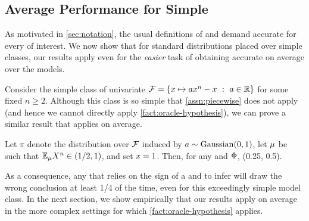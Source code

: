 %
%
%
%
%
%
%
%
%
%
%
%
%
%
%
%
%
%


\subsection{Average \localName{} Performance for Simple \modelNames{}}\label{sec:average-behaviour}

As motivated in \cref{sec:notation}, the usual definitions of \specname{} and \sensname{} demand accurate \hyptestnames{} for every \modelname{} of interest. We now show that for standard distributions placed over simple \modelname{} classes, our results apply even for the \emph{easier} task of obtaining accurate \hyptestnames{} on average over the models.

Consider the simple class of univariate \modelnames{} $\mathcal{F} = \{x\mapsto a x^n - x \ : \  a\in\mathbb{R}\}$ for some fixed $n \geq 2$. Although this \modelname{} class is so simple that \cref{assn:piecewise} does not apply (and hence we cannot directly apply \cref{fact:oracle-hypothesis}), we can prove a similar result that applies on average.

\begin{proposition}\label{fact:random-quadratic}
Let $\pi$ denote the distribution over $\mathcal{F}$ induced by $a \sim \mathrm{Gaussian}(0,1)$, let $\mu$ be such that $\mathbb{E}_\mu X^n \in (1/2,1)$, and set $x=1$. Then, for any \completename{} and \additivename{} $\Phi$,
\*[
    \PP_{\model\sim\pi}\Big[\sgn(\expdef(\model,\covdist,\covval)) \neq \sgn(\model'(\covval)) \Big] \in (0.25, 0.5).
\]
\end{proposition}

As a consequence, any \oraclehyptestname{} that relies on the sign of a \completename{} and \additivename{} \fielddefname{} to infer \localname{} \countmodbehaviourname{} will draw the wrong conclusion at least 1/4 of the time, even for this exceedingly simple model class.
In the next section, we show empirically that our results apply on average in the more complex settings for which \cref{fact:oracle-hypothesis} applies.

%
